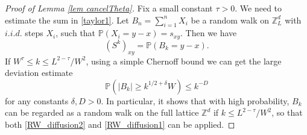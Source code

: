 \documentclass{article}
\newcommand{\1}{\mathds{1}}
\numberwithin{equation}{section}
\newcommand{\be}{\begin{equation}}
\newcommand{\ee}{\end{equation}}
\renewcommand{\leq}{\leqslant}
\renewcommand{\geq}{\geqslant}
\renewcommand{\le}{\leq}
\renewcommand{\ge}{\geq}
\renewcommand{\P}{\mathbb{P}}
\newcommand{\Z}{\mathbb{Z}}
\theoremstyle{plain} %
\theoremstyle{remark}
\begin{document}
\begin{proof}[Proof of Lemma \ref{lem cancelTheta}]
Fix a small constant $\tau>0$. We need to estimate the sum in \eqref{taylor1}. Let $B_n = \sum_{i=1}^n X_i$ be a random walk on $\Z_L^d$ with $i.i.d.$ steps $X_i$, such that $\mathbb P(X_i = y-x)=s_{xy}$. Then we have %
\be\label{ProbRW}(S^k)_{xy}=\mathbb P(B_k = y - x)  .\ee
If $W^{\tau} \le k \le L^{2-\tau}/W^{2}$, using a simple Chernoff bound we can get the large deviation estimate
\be \label{largedeviation}
\P\left(|B_k| \ge k^{1/2+\delta}W \right)  \le k^{-D} %
\ee
for any constants $\delta,D>0$. In particular, it shows that with high probability, $B_k$ can be regarded as a random walk on the full lattice $\Z^d$ if $k \le L^{2-\tau}/W^{2}$, so that both \eqref{RW_diffusion2} and \eqref{RW_diffusion1} can be applied.


\end{proof}
\end{document}
